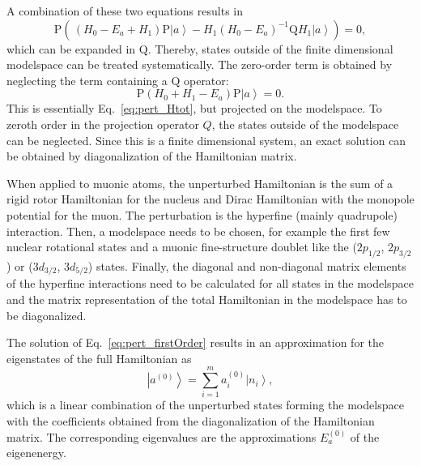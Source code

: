A combination of these two equations results in
\begin{equation}
\text{P}\left( \,
(H_0-E_a+H_1)\text{P}\left|a\right>
- H_1(H_0-E_a)^{-1}\text{Q}H_1\left|a\right>
\right) = 0,
\label{eq:pert_projectionEq}
\end{equation}
which can be expanded in $\text{Q}$. Thereby, states outside of the finite dimensional modelspace can be treated systematically. The zero-order term is obtained by neglecting the term containing a $\text{Q}$ operator:
\begin{equation}
\label{eq:pert_firstOrder}
\text{P}\left(H_0+H_1-E_a\right) \text{P}\left|a\right> = 0.
\end{equation}
This is essentially Eq.~\eqref{eq:pert_Htot}, but projected on the modelspace. To zeroth order in the projection operator $Q$, the states outside of the modelspace can be neglected. Since this is a finite dimensional system, an exact solution can be obtained by diagonalization of the Hamiltonian matrix.

When applied to muonic atoms, the unperturbed Hamiltonian is the sum of  a rigid rotor Hamiltonian for the nucleus and Dirac Hamiltonian with the monopole potential for the muon. The perturbation is the hyperfine (mainly quadrupole) interaction. Then, a modelspace needs to be chosen, for example the first few nuclear rotational states and a muonic fine-structure doublet like the ($2p_{1/2}$, $2p_{3/2}$) or ($3d_{3/2}$, $3d_{5/2}$) states. Finally, the diagonal and non-diagonal matrix elements of the hyperfine interactions need to be calculated for all states in the modelspace and the matrix representation of the total Hamiltonian in the modelspace has to be diagonalized.

The solution of Eq.~\eqref{eq:pert_firstOrder} results in an approximation for the eigenstates of the full Hamiltonian as
\begin{equation}
\label{eq:pert_firstOrderState}
\left|a^{(0)}\right> = \sum_{i=1}^m a_i^{(0)}\left|n_i\right>,
\end{equation}
which is a linear combination of the unperturbed states forming the modelspace with the coefficients obtained from the diagonalization of the Hamiltonian matrix. The corresponding eigenvalues are the approximations $E_a^{(0)}$ of the eigenenergy.

